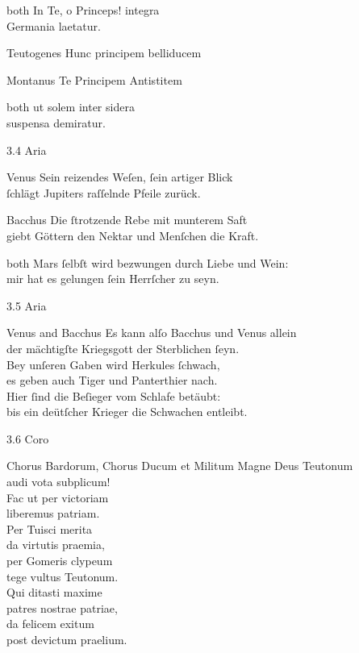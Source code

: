 \documentclass{ees}
\begin{document}
{\begin{lyrics}
  \item[both]
  In Te, o Princeps! integra\\
  Germania laetatur.
  \clearpage
  \item[Teutogenes]
  Hunc principem belliducem

  \item[Montanus]
  Te Principem Antistitem

  \item[both]
  ut solem inter sidera\\
  suspensa demiratur.
\end{lyrics}

3.4 Aria
\begin{lyrics}
  \item[Venus]
  Sein reizendes Weſen, ſein artiger Blick\\
  ſchlägt Jupiters raſſelnde Pfeile zurück.

  \item[Bacchus]
  Die ſtrotzende Rebe mit munterem Saft\\
  giebt Göttern den Nektar und Menſchen die Kraft.

  \item[both]
  Mars ſelbſt wird bezwungen durch Liebe und Wein:\\
  mir hat es gelungen ſein Herrſcher zu seyn.
\end{lyrics}

3.5 Aria
\begin{lyrics}
  \item[Venus and Bacchus]
  Es kann alſo Bacchus und Venus allein\\
  der mächtigſte Kriegsgott der Sterblichen ſeyn.\\
  Bey unſeren Gaben wird Herkules ſchwach,\\
  es geben auch Tiger und Panterthier nach.\\
  Hier ſind die Beſieger vom Schlafe betäubt:\\
  bis ein deütſcher Krieger die Schwachen entleibt.
\end{lyrics}

3.6 Coro
\begin{lyrics}
  \item[Chorus Bardorum, Chorus Ducum et Militum]
  Magne Deus Teutonum\\
  audi vota subplicum!\\
  Fac ut per victoriam\\
  liberemus patriam.\\[1ex]
  Per Tuisci merita\\
  da virtutis praemia,\\
  per Gomeris clypeum\\
  tege vultus Teutonum.\\[1ex]
  Qui ditasti maxime\\
  patres nostrae patriae,\\
  da felicem exitum\\
  post devictum praelium.
\end{lyrics}
}

\eesScore
\end{document}
